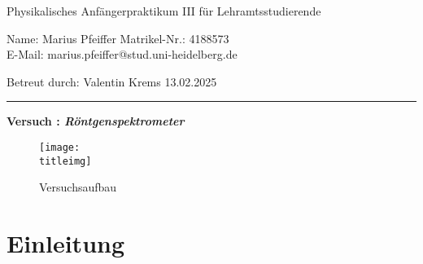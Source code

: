\documentclass[a4paper,12pt]{article}
\newcounter{versuchnr}
\begin{document}
	
	\newcommand{\name}{Marius Pfeiffer}

	\setcounter{versuchnr}{255}
	\newcommand{\versuchtitel}{Röntgenspektrometer}
	\newcommand{\protocolpdf}{files/255messprotokoll.pdf}
	\newcommand{\titleimg}{files/versuchsaufbau.png}
	\newcommand{\betreuer}{Valentin Krems}
	\newcommand{\datum}{13.02.2025}
	
	
	\begin{center}
		{Physikalisches Anfängerpraktikum III für Lehramtsstudierende}\\[3mm]
	\end{center}
	
	\vspace*{5mm}
	
	\noindent Name: \name{}
	\hfill Matrikel-Nr.: 4188573\\
	E-Mail: marius.pfeiffer@stud.uni-heidelberg.de
	
	\vspace*{2mm}
	\noindent Betreut durch: \betreuer
    \hfill \datum

	\vspace*{2mm}
	\hrule \vspace*{10mm}

  \begin{center}
    {\bf \large Versuch : \it \bf \versuchtitel}
  \end{center}

  \vspace*{10mm}

  \begin{figure}[H]
    \centering
    \texttt{[image: \\titleimg]}
    \caption{Versuchsaufbau}
  \end{figure}

  \tableofcontents
	\newpage\noindent
	\section{Einleitung}
	
	
	
	
  
	
  
	
	\newpage\noindent
	
	
	
	
	\newpage\noindent
	
	
	
\end{document}
